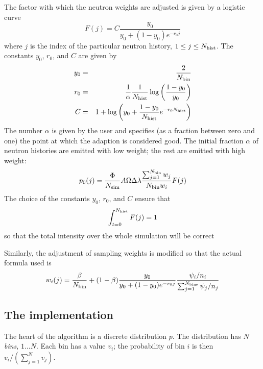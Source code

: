 The factor with which the neutron weights are adjusted is given by a
logistic curve
\begin{equation}
  F(j) = C\frac{y_0}{y_0 + (1 - y_0) e^{-r_0 j}}
\end{equation}
where $j$ is the index of the particular neutron history, $1 \leq j
\leq N_{\rm hist}$. The constants $y_0$, $r_0$, and $C$ are given by
\begin{eqnarray}
  y_0 &=& \frac{2}{N_{\rm bin}} \\
  r_0 &=& \frac{1}{\alpha}\frac{1}{N_{\rm hist}}
     \log\left(\frac{1 - y_0}{y_0}\right) \\
  C &=& 1 + \log\left(y_0 + \frac{1 - y_0}{N_{\rm hist}}
     e^{-r_0 N_{\rm hist}}\right)
\end{eqnarray}
The number $\alpha$ is given by the user and specifies (as a fraction
between zero and one) the point at which the adaption is considered
good. The initial fraction $\alpha$ of neutron histories are emitted
with low weight; the rest are emitted with high weight:
\begin{equation}
  p_0(j) =
    \frac{\Phi}{N_{\rm sim}} A \Omega \Delta\lambda
    \frac{\sum_{j=1}^{N_{\rm bin}} w_j}{N_{\rm bin} w_i}
    F(j)
\end{equation}
The choice of the constants $y_0$, $r_0$, and $C$ ensure that
\begin{equation}
\int_{t=0}^{N_{\rm hist}} F(j) = 1
\end{equation}
so that the total intensity over the whole simulation will be correct

Similarly, the adjustment of sampling weights is modified so that the
actual formula used is
\begin{equation}
w_i(j) = \frac{\beta}{N_{\rm bin}} +
    (1-\beta) \frac{y_0}{y_0 + (1 - y_0) e^{-r_0 j}}
     \frac{\psi_i/n_i}{\sum_{j=1}^{N_{\rm bins}} \psi_j/n_j}
\end{equation}

\subsection{The implementation}

The heart of the algorithm is a discrete distribution $p$. The
distribution has $N$ \emph{bins}, $1\ldots N$. Each bin has a value
$v_i$; the probability of bin $i$ is then $v_i/(\sum_{j=1}^N v_j)$.

